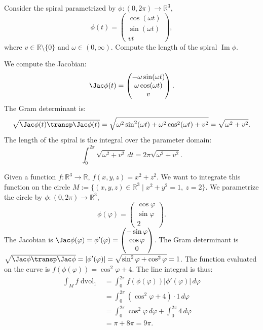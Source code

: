\begin{example}
\label{ex:spiral_length}
Consider the spiral parametrized by $\phi : (0,2\pi) \to \mathbb{R}^3$,
\[\phi(t) = \begin{pmatrix} \cos(\omega t) \\ \sin(\omega t) \\ vt \end{pmatrix},\]
where $v \in \mathbb{R}\setminus\{0\}$ and $\omega \in (0,\infty)$. Compute the length of the spiral $\operatorname{Im}\phi$.

We compute the Jacobian:
\[\Jac\phi(t) = \begin{pmatrix} -\omega\sin(\omega t) \\ \omega\cos(\omega t) \\ v \end{pmatrix}.\]
The Gram determinant is:
\[\sqrt{\Jac\phi(t)\transp \Jac\phi(t)} = \sqrt{\omega^2\sin^2(\omega t) + \omega^2\cos^2(\omega t) + v^2} = \sqrt{\omega^2 + v^2}.\]
The length of the spiral is the integral over the parameter domain:
\[\int_0^{2\pi} \sqrt{\omega^2 + v^2} \,dt = 2\pi\sqrt{\omega^2 + v^2}.\]
\end{example}

\begin{example}
\label{ex:line_integral_function_circle}
Given a function $f: \mathbb{R}^3 \to \mathbb{R}$, $f(x,y,z) = x^2+z^2$. We want to integrate this function on the circle $M := \{(x,y,z) \in \mathbb{R}^3 \mid x^2+y^2=1,\ z=2\}$.
We parametrize the circle by $\phi: (0,2\pi) \to \mathbb{R}^3$,
\[\phi(\varphi) = \begin{pmatrix} \cos\varphi \\ \sin\varphi \\ 2 \end{pmatrix}.\]
The Jacobian is $\Jac\phi(\varphi) = \phi'(\varphi) = \begin{pmatrix} -\sin\varphi \\ \cos\varphi \\ 0 \end{pmatrix}$.
The Gram determinant is $\sqrt{\Jac\phi\transp \Jac\phi} = |\phi'(\varphi)| = \sqrt{\sin^2\varphi + \cos^2\varphi} = 1$.
The function evaluated on the curve is $f(\phi(\varphi)) = \cos^2\varphi + 4$.
The line integral is thus:
\begin{align*}
\int_M f \mathop{d\text{vol}}_1 &= \int_0^{2\pi} f(\phi(\varphi)) |\phi'(\varphi)| \,d\varphi \\
&= \int_0^{2\pi} (\cos^2\varphi + 4) \cdot 1 \,d\varphi \\
&= \int_0^{2\pi} \cos^2\varphi \,d\varphi + \int_0^{2\pi} 4 \,d\varphi \\
&= \pi + 8\pi = 9\pi.
\end{align*}
\end{example}

